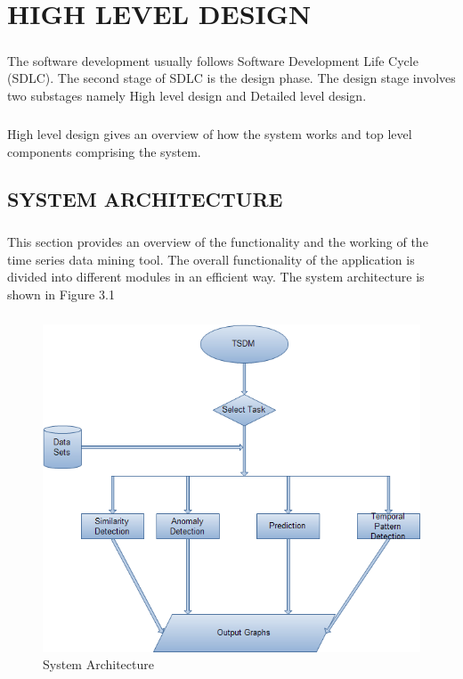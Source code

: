 \documentclass[12pt]{report}
\begin{document}
\chapter{HIGH LEVEL DESIGN}
\paragraph{}The software development usually follows Software Development Life Cycle (SDLC). The second stage of SDLC is the design phase. The design stage involves two substages namely High level design and Detailed level design.\\
\paragraph{} High level design gives an overview of how the system works and top level components comprising the system.

\section{SYSTEM ARCHITECTURE}
\paragraph{}This section provides an overview of  the functionality and the working of the time series data mining tool. The overall functionality of the application is divided into different modules in an efficient way. The system architecture is shown in Figure 3.1
\paragraph{}

\begin{figure}[h!]
	\centering
		\includegraphics[scale=0.7]{system-architecture.png}
		\caption{System Architecture}
\end{figure} 
\end{document}

